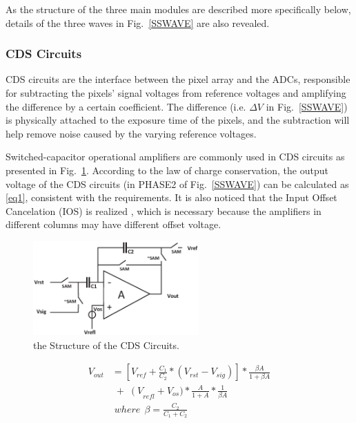 As the structure of the three main modules are described more specifically below, details of the three waves in Fig.~\ref{SSWAVE} are also revealed.

\subsubsection{CDS Circuits}

CDS circuits are the interface between the pixel array and the ADCs, responsible for subtracting the pixels’ signal voltages from reference voltages and 
amplifying the difference by a certain coefficient. The difference (i.e. $\Delta{V}$ in Fig.~\ref{SSWAVE}) is physically attached to the exposure time of the pixels, 
and the subtraction will help remove noise caused by the varying reference voltages. 

Switched-capacitor operational amplifiers are commonly used in CDS circuits as presented in Fig.~\ref{CDS}. According to the law of charge conservation, 
the output voltage of the CDS circuits (in PHASE2 of Fig.~\ref{SSWAVE}) can be calculated as \eqref{eq1}, consistent with the requirements. It is also noticed that the Input Offset Cancelation (IOS) is realized \cite{razavi_design_1992}, 
which is necessary because the amplifiers in different columns may have different offset voltage.

\begin{figure}[htbp]
	\centerline{\includegraphics[width=2.5in]{./Figures/CDS.eps}}
	\caption{the Structure of the CDS Circuits.}
	\label{CDS}
\end{figure} 

\begin{equation}
	\begin{aligned}
		V_{out}&=\left[ V_{ref}+\frac{C_1}{C_2}\ast\left(V_{rst}-V_{sig}\right)\right]\ast\frac{\beta A}{1+\beta A}\\
		&\;{+}\;\left(V\right._{refl}+V_{os})\ast\frac{A}{1+A}\ast\frac{1}{\beta A}\\
		&\;where\ \ \beta=\frac{C_2}{C_1+C_2}
		\label{eq1}
	\end{aligned}
\end{equation}

